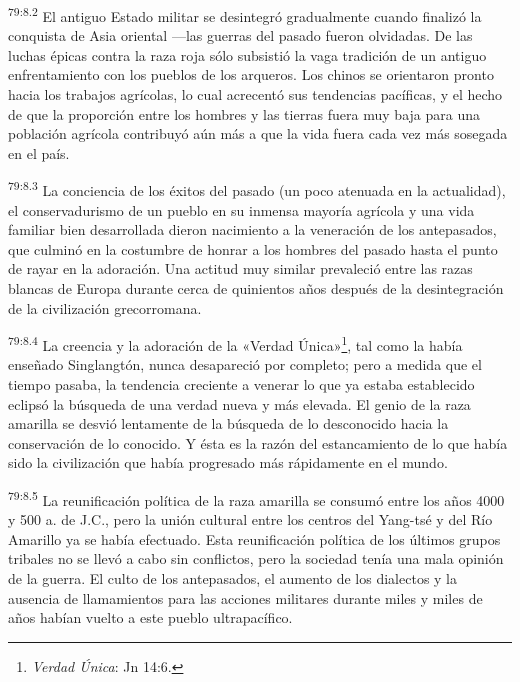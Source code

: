 \par
\textsuperscript{79:8.2} El antiguo Estado militar se desintegró gradualmente cuando finalizó la conquista de Asia oriental ---las guerras del pasado fueron olvidadas. De las luchas épicas contra la raza roja sólo subsistió la vaga tradición de un antiguo enfrentamiento con los pueblos de los arqueros. Los chinos se orientaron pronto hacia los trabajos agrícolas, lo cual acrecentó sus tendencias pacíficas, y el hecho de que la proporción entre los hombres y las tierras fuera muy baja para una población agrícola contribuyó aún más a que la vida fuera cada vez más sosegada en el país.

\par
\textsuperscript{79:8.3} La conciencia de los éxitos del pasado (un poco atenuada en la actualidad), el conservadurismo de un pueblo en su inmensa mayoría agrícola y una vida familiar bien desarrollada dieron nacimiento a la veneración de los antepasados, que culminó en la costumbre de honrar a los hombres del pasado hasta el punto de rayar en la adoración. Una actitud muy similar prevaleció entre las razas blancas de Europa durante cerca de quinientos años después de la desintegración de la civilización grecorromana.

\par
\textsuperscript{79:8.4} La creencia y la adoración de la «Verdad Única»\footnote{\textit{Verdad Única}: Jn 14:6.}, tal como la había enseñado Singlangtón, nunca desapareció por completo; pero a medida que el tiempo pasaba, la tendencia creciente a venerar lo que ya estaba establecido eclipsó la búsqueda de una verdad nueva y más elevada. El genio de la raza amarilla se desvió lentamente de la búsqueda de lo desconocido hacia la conservación de lo conocido. Y ésta es la razón del estancamiento de lo que había sido la civilización que había progresado más rápidamente en el mundo.

\par
\textsuperscript{79:8.5} La reunificación política de la raza amarilla se consumó entre los años 4000 y 500 a. de J.C., pero la unión cultural entre los centros del Yang-tsé y del Río Amarillo ya se había efectuado. Esta reunificación política de los últimos grupos tribales no se llevó a cabo sin conflictos, pero la sociedad tenía una mala opinión de la guerra. El culto de los antepasados, el aumento de los dialectos y la ausencia de llamamientos para las acciones militares durante miles y miles de años habían vuelto a este pueblo ultrapacífico.

